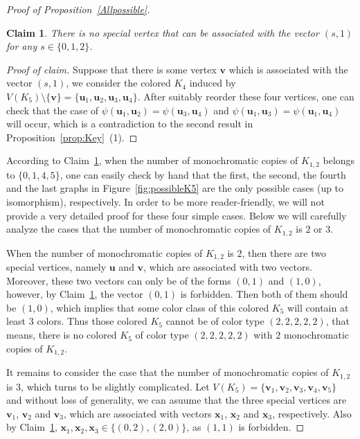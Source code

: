 \documentclass[11pt]{article}
\newtheorem{claim}[theorem]{Claim}
\theoremstyle{definition}
\newenvironment{poc}{\begin{proof}[Proof of claim]\renewcommand*{\qedsymbol}{$\blacksquare$}}{\end{proof}}
\begin{document}
\begin{proof}[Proof of Proposition~\ref{Allpossible}]
\begin{claim}\label{claim:s1s1}
    There is no special vertex that can be associated with the vector $(s,1)$ for any $s\in\{0,1,2\}$.
\end{claim}
\begin{poc}
   Suppose that there is some vertex $\boldsymbol{v}$ which is associated with the vector $(s,1)$, we consider the colored $K_{4}$ induced by $V(K_{5})\setminus \{\boldsymbol{v}\}=\{\boldsymbol{u}_{1},\boldsymbol{u}_{2},\boldsymbol{u}_{3},\boldsymbol{u}_{4}\}$. After suitably reorder these four vertices, one can check that the case of $\psi(\boldsymbol{u}_{1},\boldsymbol{u}_{2})=\psi(\boldsymbol{u}_{3},\boldsymbol{u}_{4})$ and $\psi(\boldsymbol{u}_{1},\boldsymbol{u}_{3})=\psi(\boldsymbol{u}_{1},\boldsymbol{u}_{4})$ will occur, which is a contradiction to the second result in Proposition~\ref{prop:Key}~(1). 
\end{poc}

According to Claim~\ref{claim:s1s1}, when the number of monochromatic copies of $K_{1,2}$ belongs to $\{0,1,4,5\}$, one can easily check by hand that the first, the second, the fourth and the last graphs in Figure~\ref{fig:possibleK5} are the only possible cases (up to isomorphism), respectively. In order to be more reader-friendly, we will not provide a very detailed proof for these four simple cases. Below we will carefully analyze the cases that the number of monochromatic copies of $K_{1,2}$ is $2$ or $3$.

When the number of monochromatic copies of $K_{1,2}$ is $2$, then there are two special vertices, namely $\boldsymbol{u}$ and $\boldsymbol{v}$, which are associated with two vectors. Moreover, these two vectors can only be of the forms $(0,1)$ and $(1,0)$, however, by Claim~\ref{claim:s1s1}, the vector $(0,1)$ is forbidden. Then both of them should be $(1,0)$, which implies that some color class of this colored $K_{5}$ will contain at least $3$ colors. Thus those colored $K_{5}$ cannot be of color type $(2,2,2,2,2)$, that means, there is no colored $K_{5}$ of color type $(2,2,2,2,2)$ with $2$ monochromatic copies of $K_{1,2}$.

It remains to consider the case that the number of monochromatic copies of $K_{1,2}$ is $3$, which turns to be slightly complicated. Let $V(K_{5})=\{\boldsymbol{v}_{1},\boldsymbol{v}_{2},\boldsymbol{v}_{3},\boldsymbol{v}_{4},\boldsymbol{v}_{5}\}$ and without loss of generality, we can asuume that the three special vertices are $\boldsymbol{v}_{1}$, $\boldsymbol{v}_{2}$ and $\boldsymbol{v}_{3}$, which are associated with vectors $\boldsymbol{x}_{1}$, $\boldsymbol{x}_{2}$ and $\boldsymbol{x}_{3}$, respectively. Also by Claim~\ref{claim:s1s1}, $\boldsymbol{x}_{1},\boldsymbol{x}_{2},\boldsymbol{x}_{3}\in\{(0,2),(2,0)\}$, as $(1,1)$ is forbidden.


\end{proof}
\end{document}
